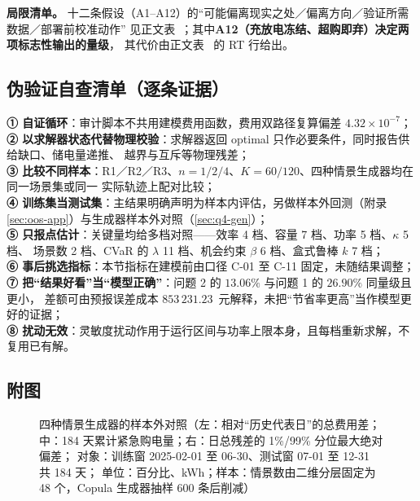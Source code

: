\textbf{局限清单。} 十二条假设（A1--A12）的“可能偏离现实之处／偏离方向／验证所需数据／部署前校准动作”
见正文表~；其中\textbf{A12（充放电冻结、超购即弃）决定两项标志性输出的量级}，
其代价由正文表~ 的 RT 行给出。

\subsection{伪验证自查清单（逐条证据）}\label{sec:fakeverify-app}

\noindent
\textbf{① 自证循环}：审计脚本不共用建模费用函数，费用双路径复算偏差 \(4.32\times10^{-7}\)；\\
\textbf{② 以求解器状态代替物理校验}：求解器返回 optimal 只作必要条件，同时报告供给缺口、储电量递推、
越界与互斥等物理残差；\\
\textbf{③ 比较不同样本}：R1／R2／R3、\(n=1/2/4\)、\(K=60/120\)、四种情景生成器均在同一场景集或同一
实际轨迹上配对比较；\\
\textbf{④ 训练集当测试集}：主结果明确声明为样本内评估，另做样本外回测（附录 \ref{sec:oos-app}）与生成器样本外对照（\ref{sec:q4-gen}）；\\
\textbf{⑤ 只报点估计}：关键量均给多档对照——效率 4 档、容量 7 档、功率 5 档、\(\kappa\) 5 档、
场景数 2 档、CVaR 的 \(\lambda\) 11 档、机会约束 \(\beta\) 6 档、盒式鲁棒 \(k\) 7 档；\\
\textbf{⑥ 事后挑选指标}：本节指标在建模前由口径 C-01 至 C-11 固定，未随结果调整；\\
\textbf{⑦ 把“结果好看”当“模型正确”}：问题 2 的 \(13.06\%\) 与问题 1 的 \(26.90\%\) 同量级且更小，
差额可由预报误差成本 \(853\,231.23\)~元解释，未把“节省率更高”当作模型更好的证据；\\
\textbf{⑧ 扰动无效}：灵敏度扰动作用于运行区间与功率上限本身，且每档重新求解，不复用已有解。

\subsection{附图}

\begin{figure}[htbp]
  \centering
  \caption{四种情景生成器的样本外对照（左：相对“历史代表日”的总费用差；
           中：184 天累计紧急购电量；右：日总残差的 1\%/99\% 分位最大绝对偏差；
           对象：训练窗 2025-02-01 至 06-30、测试窗 07-01 至 12-31 共 184 天；
           单位：百分比、kWh；样本：情景数由二维分层固定为 48 个，Copula 生成器抽样 600 条后削减）}
  \label{fig:gen-cmp}
\end{figure}

